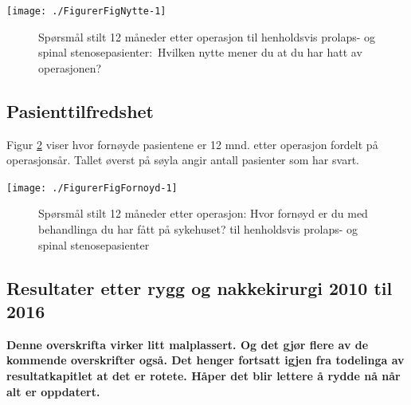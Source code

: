 \documentclass [norsk,a4paper,twoside]{article}\usepackage[]{graphicx}\usepackage[]{color}
\newenvironment{knitrout}{}{} %
\begin{document}
\begin{knitrout}
\color{fgcolor}

{\centering \texttt{[image: ./FigurerFigNytte-1]} 

}



\end{knitrout}

\begin{figure}[h] 
\begin{center}
\end{center}
\caption{Spørsmål stilt 12 måneder etter operasjon til henholdsvis prolaps- og spinal stenosepasienter$:$ Hvilken nytte mener du at du har hatt av operasjonen?}
\label{fig:Nytte}
\end{figure}




\subsection{Pasienttilfredshet}

Figur \ref{fig:Fornoyd} viser hvor fornøyde pasientene er 12 mnd. 
etter operasjon fordelt på operasjonsår. Tallet øverst på søyla angir antall pasienter som har svart. 


\begin{knitrout}
\color{fgcolor}

{\centering \texttt{[image: ./FigurerFigFornoyd-1]} 

}



\end{knitrout}

\begin{figure}[h] 
\begin{center}
\end{center}
\caption{Spørsmål stilt 12 måneder etter operasjon: Hvor fornøyd er du med behandlinga du har fått på sykehuset? til henholdsvis prolaps- og spinal stenosepasienter}
\label{fig:Fornoyd}
\end{figure}



\subsection{ Resultater etter rygg og nakkekirurgi 2010 til 2016}
\textbf{Denne overskrifta virker litt malplassert. Og det gjør flere av de kommende overskrifter også. Det henger fortsatt igjen fra todelinga av resultatkapitlet at det er rotete. Håper det blir lettere å rydde nå når alt er oppdatert.}
\end{document}

